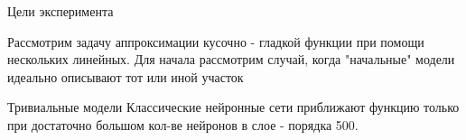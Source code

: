 \documentclass{beamer}
\begin{document}
\begin{frame}{Цели эксперимента}

    Рассмотрим задачу аппроксимации кусочно - гладкой функции   при помощи нескольких линейных. Для начала рассмотрим случай, когда "начальные" модели идеально описывают тот или иной участок  
\begin{figure}[!htb]
      \end{figure}

\end{frame}

\begin{frame}{Тривиальные модели}
Классические нейронные сети приближают функцию только при достаточно большом кол-ве нейронов  в слое - порядка 500.
\begin{figure}[!htb]
      \end{figure}

\end{frame}
\end{document}
